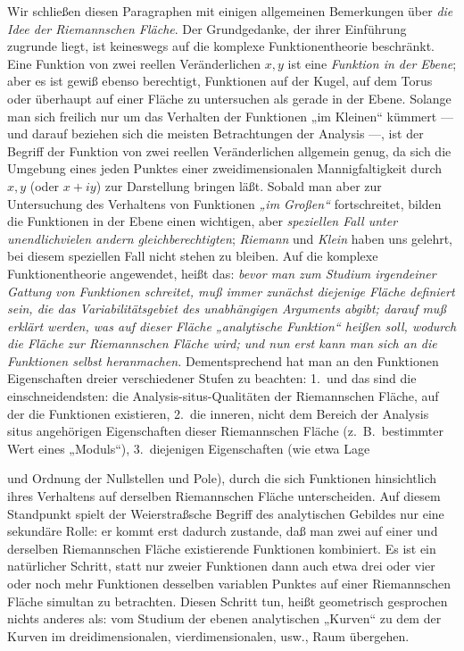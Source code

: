 \documentclass{article}
\begin{document}
Wir schließen diesen Paragraphen mit einigen allgemeinen Bemerkungen über \emph{die Idee der Riemannschen Fläche}. Der Grundgedanke, der ihrer Einführung zugrunde liegt, ist keineswegs auf die komplexe Funktionentheorie beschränkt. Eine Funktion von zwei reellen Veränderlichen $x, y$ ist eine \emph{Funktion in der Ebene}; aber es ist gewiß ebenso berechtigt, Funktionen auf der Kugel, auf dem Torus oder überhaupt auf einer Fläche zu untersuchen als gerade in der Ebene. Solange man sich freilich nur um das Verhalten der Funktionen „im Kleinen“ kümmert --- und darauf beziehen sich die meisten Betrachtungen der Analysis ---, ist der Begriff der Funktion von zwei reellen Veränderlichen allgemein genug, da sich die Umgebung eines jeden Punktes einer zweidimensionalen Mannigfaltigkeit durch $x, y$ (oder $x + iy$) zur Darstellung bringen läßt. Sobald man aber zur Untersuchung des Verhaltens von Funktionen \emph{„im Großen“} fortschreitet, bilden die Funktionen in der Ebene einen wichtigen, aber \emph{speziellen Fall unter unendlichvielen andern gleichberechtigten}; \emph{Riemann} und \emph{Klein} haben uns gelehrt, bei diesem speziellen Fall nicht stehen zu bleiben. Auf die komplexe Funktionentheorie angewendet, heißt das: \emph{bevor man zum Studium irgendeiner Gattung von Funktionen schreitet, muß immer zunächst diejenige Fläche definiert sein, die das Variabilitätsgebiet des unabhängigen Arguments abgibt; darauf muß erklärt werden, was auf dieser Fläche „analytische Funktion“ heißen soll, wodurch die Fläche zur Riemannschen Fläche wird; und nun erst kann man sich an die Funktionen selbst heranmachen.} Dementsprechend hat man an den Funktionen Eigenschaften dreier verschiedener Stufen zu beachten: 1.~und das sind die einschneidendsten: die Analysis-situs-Qualitäten der Riemannschen Fläche, auf der die Funktionen existieren, 2.~die inneren, nicht dem Bereich der Analysis situs angehörigen Eigenschaften dieser Riemannschen Fläche (z.\ B.\ bestimmter Wert eines „Moduls“), 3.~diejenigen Eigenschaften (wie etwa Lage

und Ordnung der Nullstellen und Pole), durch die sich Funktionen hinsichtlich ihres Verhaltens auf derselben Riemannschen Fläche unterscheiden. Auf diesem Standpunkt spielt der Weierstraßsche Begriff des analytischen Gebildes nur eine sekundäre Rolle: er kommt erst dadurch zustande, daß man zwei auf einer und derselben Riemannschen Fläche existierende Funktionen kombiniert. Es ist ein natürlicher Schritt, statt nur zweier Funktionen dann auch etwa drei oder vier oder noch mehr Funktionen desselben variablen Punktes auf einer Riemannschen Fläche simultan zu betrachten. Diesen Schritt tun, heißt geometrisch gesprochen nichts anderes als: vom Studium der ebenen analytischen „Kurven“ zu dem der Kurven im dreidimensionalen, vierdimensionalen, usw., Raum übergehen.
\end{document}

